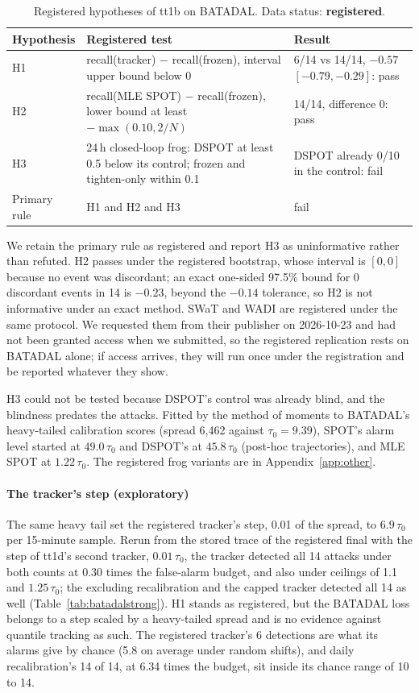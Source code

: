 \documentclass[sigconf,review,anonymous]{acmart}
\begin{document}
\begin{table}[t]
\caption{Registered hypotheses of tt1b on BATADAL. Data status: \textbf{registered}.}
\label{tab:tt1b}
\begin{tabular}{@{}p{}p{}p{}@{}}
\toprule
Hypothesis & Registered test & Result \\
\midrule
H1 & recall(tracker) $-$ recall(frozen), interval upper bound below 0 & 6/14 vs 14/14, $-0.57$ $[-0.79, -0.29]$: pass \\
H2 & recall(MLE SPOT) $-$ recall(frozen), lower bound at least $-\max(0.10, 2/N)$ & 14/14, difference 0: pass \\
H3 & 24\,h closed-loop frog: DSPOT at least 0.5 below its control; frozen and tighten-only within 0.1 & DSPOT already 0/10 in the control: fail \\
Primary rule & H1 and H2 and H3 & fail \\
\bottomrule
\end{tabular}
\end{table}

We retain the primary rule as registered and report H3 as uninformative rather than refuted. H2
passes under the registered bootstrap, whose interval is $[0, 0]$ because no event was discordant; an
exact one-sided 97.5\% bound for 0 discordant events in 14 is $-0.23$, beyond the $-0.14$ tolerance,
so H2 is not informative under an exact method. SWaT and WADI are registered under the same protocol.
We requested them from their publisher on 2026-10-23 and had not been granted access when we
submitted, so the registered replication rests on BATADAL alone; if access arrives, they will run once
under the registration and be reported whatever they show.

H3 could not be tested because DSPOT's control was already blind, and the blindness predates the
attacks. Fitted by the method of moments to BATADAL's heavy-tailed calibration scores (spread 6,462
against $\tau_0 = 9.39$), SPOT's alarm level started at $49.0\,\tau_0$ and DSPOT's at $45.8\,\tau_0$
(post-hoc trajectories), and MLE SPOT at
$1.22\,\tau_0$. The registered frog variants are in Appendix~\ref{app:other}.

\paragraph{The tracker's step (exploratory)}
The same heavy tail set the registered tracker's step, 0.01 of the spread, to $6.9\,\tau_0$ per
15-minute sample. Rerun from the stored trace of the registered final with the step of tt1d's second
tracker, $0.01\,\tau_0$, the tracker detected all 14 attacks under both counts at 0.30 times the
false-alarm budget, and also under ceilings of 1.1 and $1.25\,\tau_0$; the excluding recalibration and
the capped tracker detected all 14 as well (Table~\ref{tab:batadalstrong}). H1 stands as registered, but
the BATADAL loss belongs to a step scaled by a heavy-tailed spread and is no evidence against quantile
tracking as such. The registered tracker's 6 detections are what its alarms give by chance
(5.8 on average under random shifts), and daily recalibration's 14 of 14, at 6.34 times the budget,
sit inside its chance range of 10 to 14.
\end{document}

